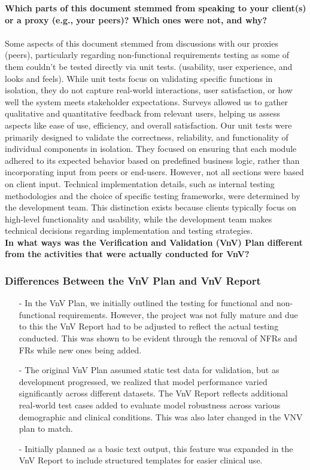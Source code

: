 \documentclass[12pt, titlepage]{article}
\begin{document}
  \newline  \newline \textbf{Which parts of this document stemmed from speaking to your client(s) or a proxy (e.g., your peers)? Which ones were not, and why?}  \\\\
  Some aspects of this document stemmed from discussions with our proxies (peers), particularly regarding non-functional requirements testing as some of them couldn't be tested directly via unit tests. (usability, user experience, and looks and feels). While unit tests focus on validating specific functions in isolation, they do not capture real-world interactions, user satisfaction, or how well the system meets stakeholder expectations. Surveys allowed us to gather qualitative and quantitative feedback from relevant users, helping us assess aspects like ease of use, efficiency, and overall satisfaction. Our unit tests were primarily designed to validate the correctness, reliability, and functionality of individual components in isolation. They focused on ensuring that each module adhered to its expected behavior based on predefined business logic, rather than incorporating input from peers or end-users.
  \newline
  However, not all sections were based on client input. Technical implementation details, such as internal testing methodologies and the choice of specific testing frameworks, were determined by the development team. This distinction exists because clients typically focus on high-level functionality and usability, while the development team makes technical decisions regarding implementation and testing strategies. \\ 
  \newline
  \textbf{In what ways was the Verification and Validation (VnV) Plan different from the activities that were actually conducted for VnV?}
  \vspace{-10pt}
\subsubsection*{Differences Between the VnV Plan and VnV Report}
  \begin{itemize}
  \item[-] In the VnV Plan, we initially outlined the testing for functional and non-functional requirements. However, the project was not fully mature and due to this the VnV Report had to be adjusted to reflect the actual testing conducted. This was shown to be evident through the removal of NFRs and FRs while new ones being added.  
  \item[-] The original VnV Plan assumed static test data for validation, but as development progressed, we realized that model performance varied significantly across different datasets. The VnV Report reflects additional real-world test cases added to evaluate model robustness across various demographic and clinical conditions. This was also later changed in the VNV plan to match.
  \item[-] Initially planned as a basic text output, this feature was expanded in the VnV Report to include structured templates for easier clinical use.
  \end{itemize}
  
\end{document}
